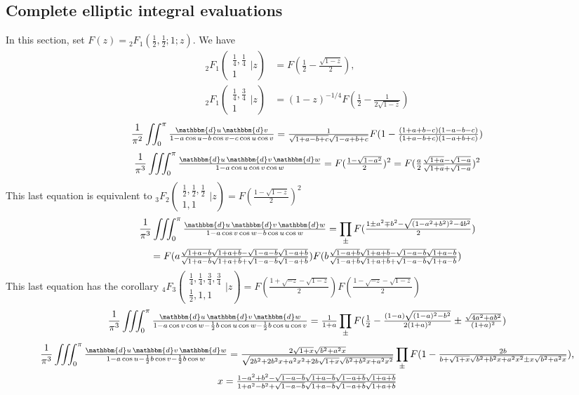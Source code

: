 \documentclass[12pt]{article}
\newcommand{\dd}[0] {\mathbbm{d}}
\numberwithin{equation}{section}
\newcommand{\FFs}[6] {{}_{#1}{#2}_{#3} ( \begin{smallmatrix} #4 \\ #5 \end{smallmatrix} | {#6}  )}
\begin{document}
\subsection{Complete elliptic integral evaluations}
In this section, set $F(z) = {}_2 F_1 (\frac12, \frac12; 1; z)$. We have
\begin{align*}
\FFs{2}{F}{1}{\frac14,\frac14}{1}{z} &= F(\tfrac12 - \tfrac{\sqrt{1-z}}{2})\text{,}\\
\FFs{2}{F}{1}{\frac14,\frac34}{1}{z} &= (1-z)^{-1/4}F(\tfrac12 - \tfrac{1}{2\sqrt{1-z}})
\end{align*}
\begin{equation*}
\frac{1}{\pi^2} \iint_0^{\pi} \tfrac{\dd u \, \dd v} {1 - a \cos u - b \cos v - c \cos u \cos v} = \tfrac{1}{\sqrt{1+a-b+c}\sqrt{1-a+b+c}} F(1-\tfrac{(1+a+b-c)(1-a-b-c)}{(1+a-b+c)(1-a+b+c)})
\end{equation*}
\begin{equation*}
\frac{1}{\pi^3} \iiint_0^{\pi} \tfrac{\dd u \, \dd v \, \dd w} {1 - a \cos u \cos v \cos w} =  F(\tfrac{1-\sqrt{1-a^2}}{2})^2 = F(\tfrac{a}{2}\tfrac{\sqrt{1+a}-\sqrt{1-a}}{\sqrt{1+a}+\sqrt{1-a}})^2
\end{equation*}
This last equation is equivalent to
$\FFs{3}{F}{2}{\frac12,\frac12,\frac12}{1,1}{z} = F(\tfrac{1 -\sqrt{1-z}}{2})^2$
\begin{gather*}
\frac{1}{\pi^3} \iiint_0^{\pi} \tfrac{\dd u \, \dd v \, \dd w} {1 - a \cos v \cos w - b \cos u \cos w} = \prod_{\pm} F(\tfrac{1 \pm a^2 \mp b^2-\sqrt{(1-a^2+b^2)^2-4b^2}}{2})\\
= F(a\tfrac{\sqrt{1+a-b}\sqrt{1+a+b}-\sqrt{1-a-b}\sqrt{1-a+b}}{\sqrt{1+a-b}\sqrt{1+a+b}+\sqrt{1-a-b}\sqrt{1-a+b}})F(b\tfrac{\sqrt{1-a+b}\sqrt{1+a+b}-\sqrt{1-a-b}\sqrt{1+a-b}}{\sqrt{1-a+b}\sqrt{1+a+b}+\sqrt{1-a-b}\sqrt{1+a-b}})
\end{gather*}
This last equation has the corollary
$\FFs{4}{F}{3}{\frac14,\frac14,\frac34,\frac34}{\frac12,1,1}{z} = F(\tfrac{1+\sqrt{-z} -\sqrt{1-z}}{2})F(\tfrac{1-\sqrt{-z} -\sqrt{1-z}}{2})$
\begin{gather*}
\frac{1}{\pi^3} \iiint_0^{\pi} \tfrac{\dd u \, \dd v \, \dd w} {1 - a \cos v \cos w - \frac12 b \cos u \cos w - \frac12 b \cos u \cos v} = \tfrac{1}{1+a} \prod_{\pm} F(\tfrac{1}{2}-\tfrac{(1-a)\sqrt{(1-a)^2-b^2}}{2(1+a)^2} \pm \tfrac{\sqrt{4a^2+a b^2}}{(1+a)^2})
\end{gather*}
\begin{gather*}
\frac{1}{\pi^3} \iiint_0^{\pi} \tfrac{\dd u \, \dd v \, \dd w} {1 - a \cos u - \frac12 b \cos v - \frac12 b \cos w} = \tfrac{2\sqrt{1+x}\sqrt{b^2+a^2 x}}{\sqrt{2b^2 + 2b^2 x + a^2 x^2 + 2b \sqrt{1+x}\sqrt{b^2+b^2 x + a^2 x^2}}} \prod_{\pm} F(1-\tfrac{2b}{b+\sqrt{1+x}\sqrt{b^2+b^2 x+a^2 x^2} \pm x \sqrt{b^2+ a^2 x}}) \text{,}\\
x = \tfrac{1-a^2+b^2 - \sqrt{1-a-b} \sqrt{1+a-b} \sqrt{1-a+b} \sqrt{1+a+b}}{1+a^2-b^2 + \sqrt{1-a-b} \sqrt{1+a-b} \sqrt{1-a+b} \sqrt{1+a+b}}
\end{gather*}
\end{document}
